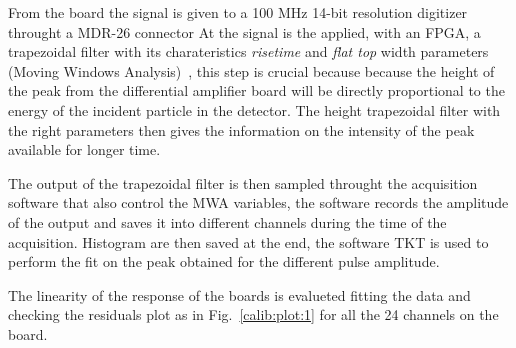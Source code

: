 From the board the signal is given to a 100 MHz 14-bit resolution digitizer throught a MDR-26 connector
At the signal is the applied, with an FPGA, a trapezoidal filter with its charateristics \emph{risetime} and \emph{flat top} width parameters (Moving Windows Analysis)~\cite{salathe}, this step is crucial because because the height of the peak from the differential amplifier board will be directly proportional to the energy of the incident particle in the detector.
The height trapezoidal filter with the right parameters then gives the information on the intensity of the peak available for longer time.


The output of the trapezoidal filter is then sampled throught the acquisition software that also control the MWA variables, the software records the amplitude of the output and saves it into different channels during the time of the acquisition. Histogram are then saved at the end, the software TKT is used to perform the fit on the peak obtained for the different pulse amplitude. 

The linearity of the response of the boards is evalueted fitting the data and checking the residuals plot as in Fig.~\ref{calib:plot:1} for all the 24 channels on the board.

